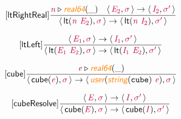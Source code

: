 \documentclass[10pt,leqno,fleqn]{article}
\newcommand{\artVariable}[1]{\mbox{\color{purple}\em #1\/}}
\newcommand{\artConstructor}[1]{\mbox{\sf #1}}
\newcommand{\artCaseInsensitiveLiteral}[1]{\mbox{\tt #1}}
\newcommand{\artSpecial}[1]{\mbox{\color{orange}\sf\em #1}}
\begin{document}
\begin{equation}
\tag*{[\artConstructor{\sf ltRightReal}]}
\begin{split}\frac{ \artVariable{n}\triangleright \artSpecial{real64}(\_) \quad \langle\, \artVariable{E$_{2}$}, \artVariable{$\sigma$}\,\rangle \rightarrow \langle\, \artVariable{I$_{2}$}, \artVariable{$\sigma$\/$^\prime$}\,\rangle }{\langle\, \artConstructor{\sf lt}(\artVariable{n}\ \artVariable{E$_{2}$}), \artVariable{$\sigma$}\,\rangle \rightarrow \langle\, \artConstructor{\sf lt}(\artVariable{n}\ \artVariable{I$_{2}$}), \artVariable{$\sigma$\/$^\prime$}\,\rangle }
\end{split}
\end{equation}

\begin{equation}
\tag*{[\artConstructor{\sf ltLeft}]}
\begin{split}\frac{\langle\, \artVariable{E$_{1}$}, \artVariable{$\sigma$}\,\rangle \rightarrow \langle\, \artVariable{I$_{1}$}, \artVariable{$\sigma$\/$^\prime$}\,\rangle }{\langle\, \artConstructor{\sf lt}(\artVariable{E$_{1}$}\ \artVariable{E$_{2}$}), \artVariable{$\sigma$}\,\rangle \rightarrow \langle\, \artConstructor{\sf lt}(\artVariable{I$_{1}$}\ \artVariable{E$_{2}$}), \artVariable{$\sigma$\/$^\prime$}\,\rangle }
\end{split}
\end{equation}

\begin{equation}
\tag*{[\artConstructor{\sf cube}]}
\begin{split}\frac{ \artVariable{e}\triangleright \artSpecial{real64}(\_) }{\langle\, \artConstructor{\sf cube}(\artVariable{e}), \artVariable{$\sigma$}\,\rangle \rightarrow \langle\, \artSpecial{user}(\artSpecial{string}(\artCaseInsensitiveLiteral{cube})\ \artVariable{e}), \artVariable{$\sigma$}\,\rangle }
\end{split}
\end{equation}

\begin{equation}
\tag*{[\artConstructor{\sf cubeResolve}]}
\begin{split}\frac{\langle\, \artVariable{E}, \artVariable{$\sigma$}\,\rangle \rightarrow \langle\, \artVariable{I}, \artVariable{$\sigma$\/$^\prime$}\,\rangle }{\langle\, \artConstructor{\sf cube}(\artVariable{E}), \artVariable{$\sigma$}\,\rangle \rightarrow \langle\, \artConstructor{\sf cube}(\artVariable{I}), \artVariable{$\sigma$\/$^\prime$}\,\rangle }
\end{split}
\end{equation}
\end{document}
